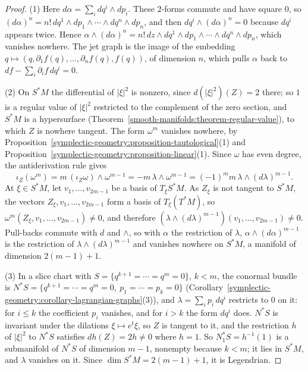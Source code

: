 \begin{proof}
(1) Here $d\alpha = \sum_idq^i \wedge dp_i$. These $2$-forms commute and have square $0$, so $(d\alpha)^n = n!\,dq^1 \wedge dp_1 \wedge \cdots \wedge dq^n \wedge dp_n$, and then $dq^i \wedge (d\alpha)^n = 0$ because
$dq^i$ appears twice. Hence $\alpha \wedge (d\alpha)^n = n!\,dz \wedge dq^1 \wedge dp_1 \wedge \cdots \wedge dq^n \wedge dp_n$, which vanishes nowhere. The jet graph is the image of the embedding
$q \mapsto (q, \partial_1f(q), \ldots, \partial_nf(q), f(q))$, of dimension $n$, which pulls $\alpha$ back to $df - \sum_i\partial_if\,dq^i = 0$.

(2) On $S^*M$ the differential of $|\xi|^2$ is nonzero, since $d(|\xi|^2)(Z) = 2$ there; so $1$ is a regular value of $|\xi|^2$ restricted to the complement of the zero section, and $S^*M$ is a hypersurface
(Theorem~\ref{smooth-manifolds:theorem-regular-value}), to which $Z$ is nowhere tangent. The form $\omega^m$ vanishes nowhere, by Proposition~\ref{symplectic-geometry:proposition-tautological}(1) and
Proposition~\ref{symplectic-geometry:proposition-linear}(1). Since $\omega$ has even degree, the antiderivation rule gives
\[
\iota_Z(\omega^m) = m\,(\iota_Z\omega) \wedge \omega^{m-1} = -m\,\lambda \wedge \omega^{m-1} = (-1)^mm\,\lambda \wedge (d\lambda)^{m-1}.
\]
At $\xi \in S^*M$, let $v_1, \ldots, v_{2m-1}$ be a basis of $T_\xi S^*M$. As $Z_\xi$ is not tangent to $S^*M$, the vectors $Z_\xi, v_1, \ldots, v_{2m-1}$ form a basis of $T_\xi(T^*M)$, so
$\omega^m(Z_\xi, v_1, \ldots, v_{2m-1}) \neq 0$, and therefore $(\lambda \wedge (d\lambda)^{m-1})(v_1, \ldots, v_{2m-1}) \neq 0$. Pull-backs commute with $d$ and $\wedge$, so with $\alpha$ the restriction of $\lambda$,
$\alpha \wedge (d\alpha)^{m-1}$ is the restriction of $\lambda \wedge (d\lambda)^{m-1}$ and vanishes nowhere on $S^*M$, a manifold of dimension $2(m - 1) + 1$.

(3) In a slice chart with $S = \{q^{k+1} = \cdots = q^m = 0\}$, $k < m$, the conormal bundle is $N^*S = \{q^{k+1} = \cdots = q^m = 0, \ p_1 = \cdots = p_k = 0\}$
(Corollary~\ref{symplectic-geometry:corollary-lagrangian-graphs}(3)), and $\lambda = \sum_ip_i\,dq^i$ restricts to $0$ on it: for $i \leq k$ the coefficient $p_i$ vanishes, and for $i > k$ the form $dq^i$ does.
$N^*S$ is invariant under the dilations $\xi \mapsto e^t\xi$, so $Z$ is tangent to it, and the restriction $h$ of $|\xi|^2$ to $N^*S$ satisfies $dh(Z) = 2h \neq 0$ where $h = 1$. So $N^*_1S = h^{-1}(1)$ is a
submanifold of $N^*S$ of dimension $m - 1$, nonempty because $k < m$; it lies in $S^*M$, and $\lambda$ vanishes on it. Since $\dim S^*M = 2(m - 1) + 1$, it is Legendrian.
\end{proof}


